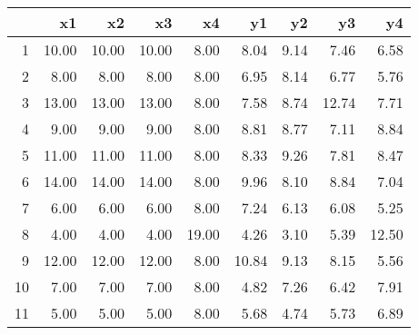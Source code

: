 \begin{table}[ht]
\centering
\begin{tabular}{rrrrrrrrr}
  \hline
 & x1 & x2 & x3 & x4 & y1 & y2 & y3 & y4 \\
  \hline
1 & 10.00 & 10.00 & 10.00 & 8.00 & 8.04 & 9.14 & 7.46 & 6.58 \\
  2 & 8.00 & 8.00 & 8.00 & 8.00 & 6.95 & 8.14 & 6.77 & 5.76 \\
  3 & 13.00 & 13.00 & 13.00 & 8.00 & 7.58 & 8.74 & 12.74 & 7.71 \\
  4 & 9.00 & 9.00 & 9.00 & 8.00 & 8.81 & 8.77 & 7.11 & 8.84 \\
  5 & 11.00 & 11.00 & 11.00 & 8.00 & 8.33 & 9.26 & 7.81 & 8.47 \\
  6 & 14.00 & 14.00 & 14.00 & 8.00 & 9.96 & 8.10 & 8.84 & 7.04 \\
  7 & 6.00 & 6.00 & 6.00 & 8.00 & 7.24 & 6.13 & 6.08 & 5.25 \\
  8 & 4.00 & 4.00 & 4.00 & 19.00 & 4.26 & 3.10 & 5.39 & 12.50 \\
  9 & 12.00 & 12.00 & 12.00 & 8.00 & 10.84 & 9.13 & 8.15 & 5.56 \\
  10 & 7.00 & 7.00 & 7.00 & 8.00 & 4.82 & 7.26 & 6.42 & 7.91 \\
  11 & 5.00 & 5.00 & 5.00 & 8.00 & 5.68 & 4.74 & 5.73 & 6.89 \\
   \hline
\end{tabular}
\end{table}
